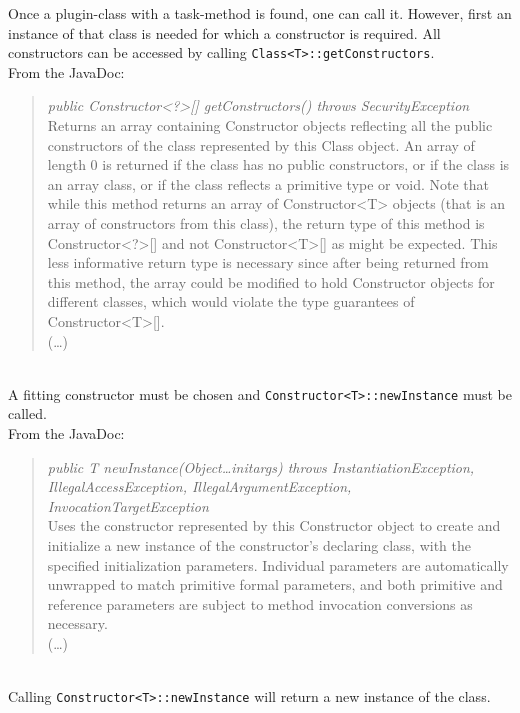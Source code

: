 Once a plugin-class with a task-method is found, one can call it.
However, first an instance of that class is needed for which a constructor is required.
All constructors can be accessed by calling \lstinline{Class<T>::getConstructors}.\\
From the JavaDoc:
\begin{quote}
    \textit{public Constructor<?>[] getConstructors() throws SecurityException}\\
    Returns an array containing Constructor objects reflecting all the public constructors of the class represented by this Class object. An array of length 0 is returned if the class has no public constructors, or if the class is an array class, or if the class reflects a primitive type or void. Note that while this method returns an array of Constructor<T> objects (that is an array of constructors from this class), the return type of this method is Constructor<?>[] and not Constructor<T>[] as might be expected. This less informative return type is necessary since after being returned from this method, the array could be modified to hold Constructor objects for different classes, which would violate the type guarantees of Constructor<T>[].\\
    (\dots)
\end{quote}~\textcite{javadoc:class}\\
A fitting constructor must be chosen and \lstinline{Constructor<T>::newInstance} must be called.\\
From the JavaDoc:
\begin{quote}
    \textit{public T newInstance(Object\dots initargs) throws InstantiationException, IllegalAccessException, IllegalArgumentException, InvocationTargetException}\\
    Uses the constructor represented by this Constructor object to create and initialize a new instance of the constructor's declaring class, with the specified initialization parameters. Individual parameters are automatically unwrapped to match primitive formal parameters, and both primitive and reference parameters are subject to method invocation conversions as necessary.\\
    (\dots)
\end{quote}~\textcite{javadoc:constructor}\\
Calling \lstinline{Constructor<T>::newInstance} will return a new instance of the class.

